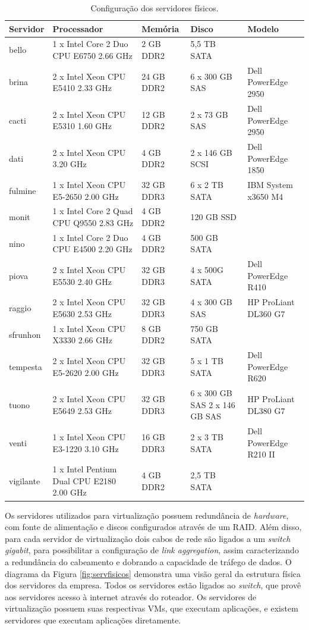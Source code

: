 \begin{table}
\caption{Configuração dos servidores físicos.}
\label{tab:servfisicos}
\begin{center}
\begin{tabular}{|l|p{4cm}|l|p{2.2cm}|l|}\hline
Servidor & Processador & Memória & Disco & Modelo\\\hline
bello & 1 x Intel Core 2 Duo CPU E6750 2.66 GHz & 2 GB DDR2 & 5,5 TB SATA & \\\hline
brina & 2 x Intel Xeon CPU E5410 2.33 GHz & 24 GB DDR2 & 6 x 300 GB SAS & Dell PowerEdge 2950\\\hline
cacti & 2 x Intel Xeon CPU E5310 1.60 GHz & 12 GB DDR2 & 2 x 73 GB SAS & Dell PowerEdge 2950\\\hline
dati & 2 x Intel Xeon CPU 3.20 GHz & 4 GB DDR2 & 2 x 146 GB SCSI & Dell PowerEdge 1850\\\hline
fulmine & 1 x Intel Xeon CPU E5-2650 2.00 GHz & 32 GB DDR3 & 6 x 2 TB SATA & IBM System x3650 M4\\\hline
monit & 1 x Intel Core 2 Quad CPU Q9550 2.83 GHz & 4 GB DDR2 & 120 GB SSD & \\\hline
nino & 1 x Intel Core 2 Duo CPU E4500 2.20 GHz & 4 GB DDR2 & 500 GB SATA & \\\hline
piova & 2 x Intel Xeon CPU E5530 2.40 GHz & 32 GB DDR3 & 4 x 500G SATA & Dell PowerEdge R410\\\hline
raggio & 2 x  Intel Xeon CPU E5630 2.53 GHz & 32 GB DDR3 & 4 x 300 GB SAS & HP ProLiant DL360 G7\\\hline
sfrunhon & 1 x Intel Xeon CPU X3330 2.66 GHz & 8 GB DDR2 & 750 GB SATA & \\\hline
tempesta & 2 x Intel Xeon CPU E5-2620 2.00 GHz & 32 GB DDR3 & 5 x 1 TB SATA & Dell PowerEdge R620\\\hline
tuono & 2 x Intel Xeon CPU E5649 2.53 GHz & 32 GB DDR3 & 6 x 300 GB SAS 2 x 146 GB SAS & HP ProLiant DL380 G7\\\hline
venti & 1 x Intel Xeon CPU E3-1220 3.10 GHz & 16 GB DDR3 & 2 x 3 TB SATA & Dell PowerEdge R210 II\\\hline
vigilante & 1 x Intel Pentium Dual CPU E2180 2.00 GHz & 4 GB DDR2 & 2,5 TB SATA & \\\hline
\end{tabular}
\end{center}
\end{table}

Os servidores utilizados para virtualização possuem redundância de \textit{hardware}, com fonte de alimentação e discos configurados através 
de um \ac{RAID}.
Além disso, para cada servidor de virtualização dois cabos de rede são ligados a um \textit{switch} \textit{gigabit}, para possibilitar a 
configuração de \textit{link aggregation}, assim caracterizando a redundância do cabeamento e dobrando a capacidade de tráfego de dados.
O diagrama da Figura \ref{fig:servfisicos} demonstra uma visão geral da estrutura física dos servidores da empresa. Todos os servidores 
estão ligados ao \textit{switch}, que provê aos servidores acesso à internet através do roteador. Os servidores de virtualização possuem suas 
respectivas \ac{VM}s, que executam aplicações, e existem servidores que executam aplicações diretamente.

